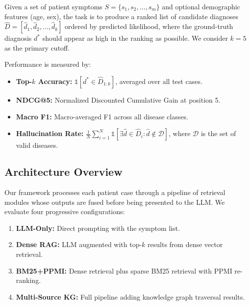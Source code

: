 \documentclass[preprint,12pt]{elsarticle}
\begin{document}
Given a set of patient symptoms $S = \{s_1, s_2, \ldots, s_m\}$ and optional demographic features (age, sex), the task is to produce a ranked list of candidate diagnoses $\hat{D} = [\hat{d}_1, \hat{d}_2, \ldots, \hat{d}_k]$ ordered by predicted likelihood, where the ground-truth diagnosis $d^*$ should appear as high in the ranking as possible. We consider $k{=}5$ as the primary cutoff.

Performance is measured by:
\begin{itemize}
    \item \textbf{Top-$k$ Accuracy:} $\mathbb{1}[d^* \in \hat{D}_{1:k}]$, averaged over all test cases.
    \item \textbf{NDCG@5:} Normalized Discounted Cumulative Gain at position 5.
    \item \textbf{Macro F1:} Macro-averaged F1 across all disease classes.
    \item \textbf{Hallucination Rate:} $\frac{1}{N}\sum_{i=1}^{N} \mathbb{1}[\exists \hat{d} \in \hat{D}_i : \hat{d} \notin \mathcal{D}]$, where $\mathcal{D}$ is the set of valid diseases.
\end{itemize}

\subsection{Architecture Overview}

Our framework processes each patient case through a pipeline of retrieval modules whose outputs are fused before being presented to the LLM. We evaluate four progressive configurations:

\begin{enumerate}
    \item \textbf{LLM-Only:} Direct prompting with the symptom list.
    \item \textbf{Dense RAG:} LLM augmented with top-$k$ results from dense vector retrieval.
    \item \textbf{BM25+PPMI:} Dense retrieval plus sparse BM25 retrieval with PPMI re-ranking.
    \item \textbf{Multi-Source KG:} Full pipeline adding knowledge graph traversal results.
\end{enumerate}
\end{document}
